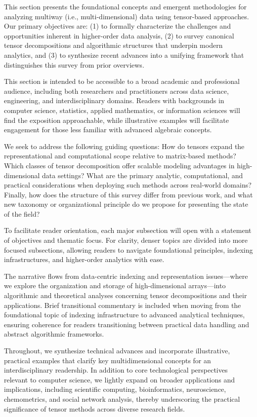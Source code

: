 \documentclass[sigconf]{acmart}
\begin{document}
This section presents the foundational concepts and emergent methodologies for analyzing multiway (i.e., multi-dimensional) data using tensor-based approaches. Our primary objectives are: (1) to formally characterize the challenges and opportunities inherent in higher-order data analysis, (2) to survey canonical tensor decompositions and algorithmic structures that underpin modern analytics, and (3) to synthesize recent advances into a unifying framework that distinguishes this survey from prior overviews. 

This section is intended to be accessible to a broad academic and professional audience, including both researchers and practitioners across data science, engineering, and interdisciplinary domains. Readers with backgrounds in computer science, statistics, applied mathematics, or information sciences will find the exposition approachable, while illustrative examples will facilitate engagement for those less familiar with advanced algebraic concepts.

We seek to address the following guiding questions: How do tensors expand the representational and computational scope relative to matrix-based methods? Which classes of tensor decomposition offer scalable modeling advantages in high-dimensional data settings? What are the primary analytic, computational, and practical considerations when deploying such methods across real-world domains? Finally, how does the structure of this survey differ from previous work, and what new taxonomy or organizational principle do we propose for presenting the state of the field?

To facilitate reader orientation, each major subsection will open with a statement of objectives and thematic focus. For clarity, denser topics are divided into more focused subsections, allowing readers to navigate foundational principles, indexing infrastructures, and higher-order analytics with ease. 

The narrative flows from data-centric indexing and representation issues—where we explore the organization and storage of high-dimensional arrays—into algorithmic and theoretical analyses concerning tensor decompositions and their applications. Brief transitional commentary is included when moving from the foundational topic of indexing infrastructure to advanced analytical techniques, ensuring coherence for readers transitioning between practical data handling and abstract algorithmic frameworks. 

Throughout, we synthesize technical advances and incorporate illustrative, practical examples that clarify key multidimensional concepts for an interdisciplinary readership. In addition to core technological perspectives relevant to computer science, we lightly expand on broader applications and implications, including scientific computing, bioinformatics, neuroscience, chemometrics, and social network analysis, thereby underscoring the practical significance of tensor methods across diverse research fields.
\end{document}
